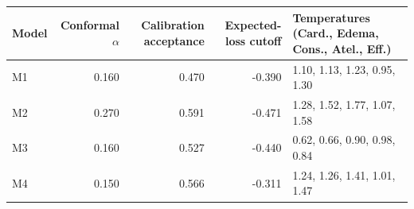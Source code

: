 \begin{tabular}{lrrrl}
\toprule
Model & Conformal $\alpha$ & Calibration acceptance & Expected-loss cutoff & Temperatures (Card., Edema, Cons., Atel., Eff.)\\
\midrule
M1 & 0.160 & 0.470 & -0.390 & 1.10, 1.13, 1.23, 0.95, 1.30\\
M2 & 0.270 & 0.591 & -0.471 & 1.28, 1.52, 1.77, 1.07, 1.58\\
M3 & 0.160 & 0.527 & -0.440 & 0.62, 0.66, 0.90, 0.98, 0.84\\
M4 & 0.150 & 0.566 & -0.311 & 1.24, 1.26, 1.41, 1.01, 1.47\\
\bottomrule
\end{tabular}

